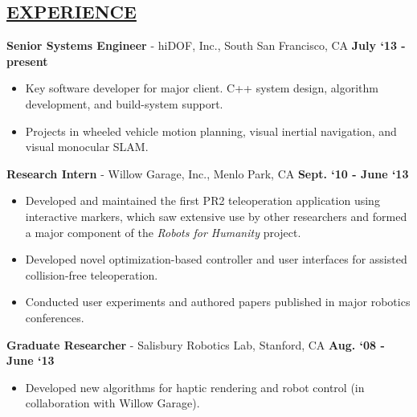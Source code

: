 \documentclass[line,margin]{res}
\newenvironment{compactlist}{
	\begin{itemize}\itemsep=0pt
}{
	\end{itemize}
}
\begin{document}

\address{469 Homer Ave, Palo Alto, CA 94301}
\address{650.762.6844}
\address{adamleeper@gmail.com}
\address{adamleeper.com $\mid$ github.com/aleeper}


\begin{resume}
%
\section{\underline{EXPERIENCE}}
\vspace{1.0pc}
{\bf Senior Systems Engineer} - hiDOF, Inc., South San Francisco, CA  \hfill \textbf{July `13 - present}
\begin{compactlist}
\item Key software developer for major client. C++ system design, algorithm development, and build-system support.
\item Projects in wheeled vehicle motion planning, visual inertial navigation, and visual monocular SLAM.
\end{compactlist}
%
{\bf Research Intern} - Willow Garage, Inc., Menlo Park, CA \hfill \textbf{Sept. `10 - June `13}
\begin{compactlist}
\item Developed and maintained the first PR2 teleoperation application using interactive markers, 
which saw extensive use by other researchers and formed a major component of the \textit{Robots for Humanity} project.
\item Developed novel optimization-based controller and user interfaces for assisted collision-free teleoperation.
\item Conducted user experiments and authored papers published in major robotics conferences.
\end{compactlist}
%
{\bf Graduate Researcher} - Salisbury Robotics Lab, Stanford, CA \hfill \textbf{Aug. `08 - June `13}
\begin{compactlist}
\item Developed new algorithms for haptic rendering and robot control (in collaboration with Willow Garage).

\end{compactlist}
\end{resume}
\end{document}
